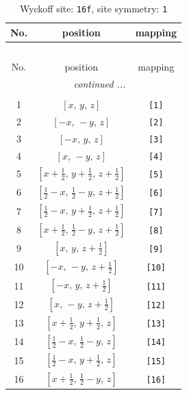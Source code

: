 \documentclass[fleqn,8pt]{jsarticle}
\begin{document}
\begin{longtable}{ccc}
\caption{Wyckoff site: {\tt 16f}, site symmetry: {\tt 1}}
 \\
 \hline \hline
No. & position & mapping \\ \hline \endfirsthead

\multicolumn{2}{l}{\tablename\ \thetable{}} \\
 \hline \hline
No. & position & mapping \\ \hline \endhead

 \hline \hline
\multicolumn{2}{r}{\footnotesize\it continued ...} \\ \endfoot

 \hline \hline
\multicolumn{2}{r}{} \\ \endlastfoot

1 & $\left[ x,\, y,\, z \right]$ & {\tt [1]} \\ \hline
2 & $\left[ - x,\, - y,\, z \right]$ & {\tt [2]} \\ \hline
3 & $\left[ - x,\, y,\, z \right]$ & {\tt [3]} \\ \hline
4 & $\left[ x,\, - y,\, z \right]$ & {\tt [4]} \\ \hline
5 & $\left[ x + \frac{1}{2},\, y + \frac{1}{2},\, z + \frac{1}{2} \right]$ & {\tt [5]} \\ \hline
6 & $\left[ \frac{1}{2} - x,\, \frac{1}{2} - y,\, z + \frac{1}{2} \right]$ & {\tt [6]} \\ \hline
7 & $\left[ \frac{1}{2} - x,\, y + \frac{1}{2},\, z + \frac{1}{2} \right]$ & {\tt [7]} \\ \hline
8 & $\left[ x + \frac{1}{2},\, \frac{1}{2} - y,\, z + \frac{1}{2} \right]$ & {\tt [8]} \\ \hline
9 & $\left[ x,\, y,\, z + \frac{1}{2} \right]$ & {\tt [9]} \\ \hline
10 & $\left[ - x,\, - y,\, z + \frac{1}{2} \right]$ & {\tt [10]} \\ \hline
11 & $\left[ - x,\, y,\, z + \frac{1}{2} \right]$ & {\tt [11]} \\ \hline
12 & $\left[ x,\, - y,\, z + \frac{1}{2} \right]$ & {\tt [12]} \\ \hline
13 & $\left[ x + \frac{1}{2},\, y + \frac{1}{2},\, z \right]$ & {\tt [13]} \\ \hline
14 & $\left[ \frac{1}{2} - x,\, \frac{1}{2} - y,\, z \right]$ & {\tt [14]} \\ \hline
15 & $\left[ \frac{1}{2} - x,\, y + \frac{1}{2},\, z \right]$ & {\tt [15]} \\ \hline
16 & $\left[ x + \frac{1}{2},\, \frac{1}{2} - y,\, z \right]$ & {\tt [16]} \\
\end{longtable}
\end{document}
